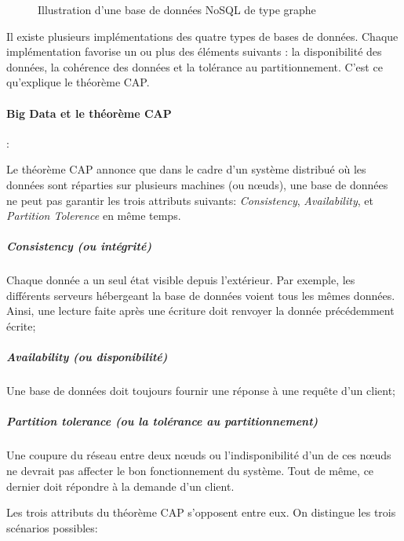 	
	\begin{figure}[H]
		\centering
		\resizebox{\textwidth}{!}{
		
	    }
		\caption{Illustration d'une base de données NoSQL de type graphe}
		\label{fig:graphe-nosql}
	\end{figure}
	
	Il existe plusieurs implémentations des quatre types de bases de données. Chaque implémentation favorise un ou plus des éléments suivants : la disponibilité des données, la cohérence des données et la tolérance au partitionnement.  C'est ce qu'explique le théorème CAP.	
		
		\paragraph{Big Data et le théorème  CAP}:
		
		Le théorème CAP annonce que dans le cadre d'un système distribué où les données sont réparties sur plusieurs machines (ou n\oe{}uds),
		une base de données ne peut pas garantir les trois attributs suivants: \textit{Consistency}, \textit{Availability}, et \textit{Partition Tolerence}  en même temps. 
		
		
			\subparagraph{ Consistency (ou intégrité)} Chaque donnée a un seul état visible depuis l'extérieur. Par exemple, les différents serveurs hébergeant la base de données voient tous les mêmes données. Ainsi, une lecture faite après une écriture doit renvoyer la donnée précédemment écrite;
			
			\subparagraph{ Availability (ou disponibilité)} Une base de données doit toujours fournir une réponse à une requête d'un client; 
			
			
			 \subparagraph{Partition tolerance (ou la tolérance au partitionnement) } Une coupure du réseau entre deux n\oe{}uds ou l'indisponibilité d'un de ces n\oe{}uds ne devrait pas affecter le bon fonctionnement du système. Tout de même,  ce dernier doit répondre à la demande d'un client. 

		
		Les trois attributs du théorème CAP s'opposent entre eux. On distingue les trois scénarios possibles:
		
